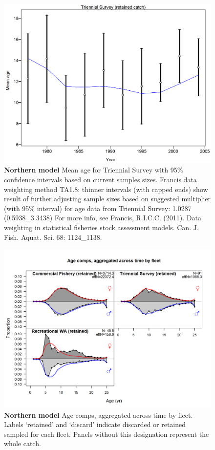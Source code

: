 \documentclass[12pt,]{article}
\begin{document}
\begin{figure}[htbp]
\centering
\includegraphics{./r4ss/plots_mod1/comp_agefit_data_weighting_TA1.8_Triennial Survey.png}
\caption{\textbf{Northern model} Mean age for Triennial Survey with 95\%
confidence intervals based on current samples sizes. Francis data
weighting method TA1.8: thinner intervals (with capped ends) show result
of further adjusting sample sizes based on suggested multiplier (with
95\% interval) for age data from Triennial Survey: 1.0287
(0.5938\_3.3438) For more info, see Francis, R.I.C.C. (2011). Data
weighting in statistical fisheries stock assessment models. Can. J.
Fish. Aquat. Sci. 68: 1124\_1138.
\label{fig:mod1_13_comp_agefit_data_weighting_TA1.8_Triennial Survey}}
\end{figure}

\begin{figure}[htbp]
\centering
\includegraphics{./r4ss/plots_mod1/comp_agefit__aggregated_across_time.png}
\caption{\textbf{Northern model} Age comps, aggregated across time by
fleet. Labels `retained' and `discard' indicate discarded or retained
sampled for each fleet. Panels without this designation represent the
whole catch. \label{fig:mod1_14_comp_agefit__aggregated_across_time}}
\end{figure}
\end{document}
